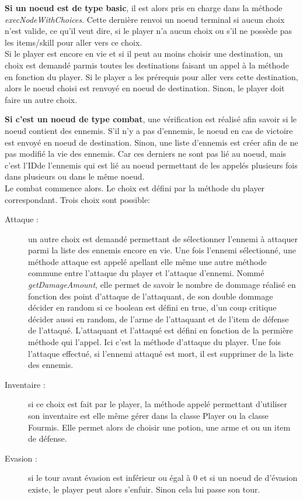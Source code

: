 		\textbf{Si un noeud est de type basic}, il est alors pris en charge dans la méthode \textit{execNodeWithChoices}. Cette dernière renvoi un noeud terminal si aucun choix n'est valide, ce qu'il veut dire, si le player n'a aucun choix ou s'il ne possède pas les items/skill pour aller vers ce choix.\\
		Si le player est encore en vie et si il peut au moins choisir une destination, un choix est demandé parmis toutes les destinations faisant un appel à la méthode en fonction du player. Si le player a les prérequis pour aller vers cette destination, alors le noeud choisi est renvoyé en noeud de destination. Sinon, le player doit faire un autre choix.

		\textbf{Si c'est un noeud de type combat}, une vérification est réalisé afin savoir si le noeud contient des ennemis. S'il n'y a pas d'ennemis, le noeud en cas de victoire est envoyé en noeud de destination. Sinon, une liste d'ennemis est créer afin de ne pas modifié la vie des ennemis. Car ces derniers ne sont pas lié au noeud, mais c'est l'IDde l'ennemis qui est lié au noeud permettant de les appelés plusieurs fois dans plusieurs ou dans le même noeud.\\
		Le combat commence alors. Le choix est défini par la méthode du player correspondant. Trois choix sont possible:

		\begin{description}
			\item[Attaque :]{un autre choix est demandé permettant de sélectionner l'ennemi à attaquer parmi la liste des ennemis encore en vie. Une fois l'ennemi sélectionné, une méthode attaque est appelé apellant elle même une autre méthode commune entre l'attaque du player et l'attaque d'ennemi. Nommé \textit{getDamageAmount}, elle permet de savoir le nombre de dommage réalisé en fonction des point d'attaque de l'attaquant, de son double dommage décider en random si ce boolean est défini en true, d'un coup critique décider aussi en random, de l'arme de l'attaquant et de l'item de défense de l'attaqué. L'attaquant et l'attaqué est défini en fonction de la permière méthode qui l'appel. Ici c'est la méthode d'attaque du player.}
			Une fois l'attaque effectué, si l'ennemi attaqué est mort, il est supprimer de la liste des ennemis.
			\item[Inventaire :]{si ce choix est fait par le player, la méthode appelé permettant d'utiliser son inventaire est elle même gérer dans la classe Player ou la classe Fourmis. Elle permet alors de choisir une potion, une arme et ou un item de défense.}
			\item[Evasion :]{si le tour avant évasion est inférieur ou égal à 0 et si un noeud de d'évasion existe, le player peut alors s'enfuir. Sinon cela lui passe son tour.}
		\end{description}

